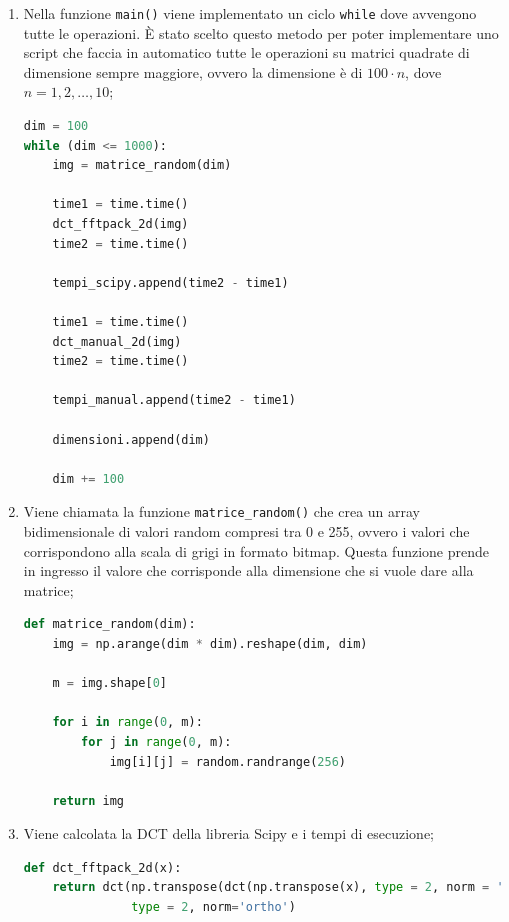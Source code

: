 \documentclass[preprint,12pt]{elsarticle}
\begin{document}
\begin{enumerate}
\item Nella funzione \texttt{main()} viene implementato un ciclo \texttt{while} dove avvengono tutte le operazioni. \`E stato scelto questo metodo per poter implementare uno script che faccia in automatico tutte le operazioni su matrici quadrate di dimensione sempre maggiore, ovvero la dimensione è di $100 \cdot n$, dove $n = 1, 2,  \dots, 10$;
\begin{lstlisting}[language=Python]
dim = 100
while (dim <= 1000):
    img = matrice_random(dim)
        
    time1 = time.time()
    dct_fftpack_2d(img)
    time2 = time.time()
        
    tempi_scipy.append(time2 - time1)
        
    time1 = time.time()
    dct_manual_2d(img)
    time2 = time.time()
        
    tempi_manual.append(time2 - time1)
        
    dimensioni.append(dim)
        
    dim += 100
\end{lstlisting}

\item Viene chiamata la funzione \texttt{matrice\_random()} che crea un array bidimensionale di valori random compresi tra 0 e 255, ovvero i valori che corrispondono alla scala di grigi in formato bitmap. Questa funzione prende in ingresso il valore che corrisponde alla dimensione che si vuole dare alla matrice;
\begin{lstlisting}[language=Python]
def matrice_random(dim):
    img = np.arange(dim * dim).reshape(dim, dim)
    
    m = img.shape[0]
    
    for i in range(0, m):
        for j in range(0, m):
            img[i][j] = random.randrange(256)
            
    return img
\end{lstlisting}

\item Viene calcolata la DCT della libreria Scipy e i tempi di esecuzione;
\begin{lstlisting}[language=Python]
def dct_fftpack_2d(x):
    return dct(np.transpose(dct(np.transpose(x), type = 2, norm = 'ortho')), \
               type = 2, norm='ortho')
               
\end{lstlisting}



\end{enumerate}
\end{document}
